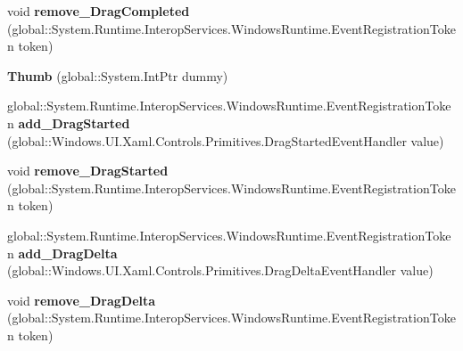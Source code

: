 \begin{DoxyCompactItemize}
\item 
\mbox{\label{class_windows_1_1_u_i_1_1_xaml_1_1_controls_1_1_primitives_1_1_thumb_a097aeafd8ad0e07599e35793e0ef16ca}} 
void {\bfseries remove\+\_\+\+Drag\+Completed} (global\+::\+System.\+Runtime.\+Interop\+Services.\+Windows\+Runtime.\+Event\+Registration\+Token token)
\item 
\mbox{\label{class_windows_1_1_u_i_1_1_xaml_1_1_controls_1_1_primitives_1_1_thumb_acd7bc9b9e039aaac5e1b684e7f15f078}} 
{\bfseries Thumb} (global\+::\+System.\+Int\+Ptr dummy)
\item 
\mbox{\label{class_windows_1_1_u_i_1_1_xaml_1_1_controls_1_1_primitives_1_1_thumb_ab1e477ea93baeef13137c92d8314a13a}} 
global\+::\+System.\+Runtime.\+Interop\+Services.\+Windows\+Runtime.\+Event\+Registration\+Token {\bfseries add\+\_\+\+Drag\+Started} (global\+::\+Windows.\+U\+I.\+Xaml.\+Controls.\+Primitives.\+Drag\+Started\+Event\+Handler value)
\item 
\mbox{\label{class_windows_1_1_u_i_1_1_xaml_1_1_controls_1_1_primitives_1_1_thumb_a44985b0beddf8dcf180137b37763091e}} 
void {\bfseries remove\+\_\+\+Drag\+Started} (global\+::\+System.\+Runtime.\+Interop\+Services.\+Windows\+Runtime.\+Event\+Registration\+Token token)
\item 
\mbox{\label{class_windows_1_1_u_i_1_1_xaml_1_1_controls_1_1_primitives_1_1_thumb_ab21b89a45b43ce6913868468c69ad277}} 
global\+::\+System.\+Runtime.\+Interop\+Services.\+Windows\+Runtime.\+Event\+Registration\+Token {\bfseries add\+\_\+\+Drag\+Delta} (global\+::\+Windows.\+U\+I.\+Xaml.\+Controls.\+Primitives.\+Drag\+Delta\+Event\+Handler value)
\item 
\mbox{\label{class_windows_1_1_u_i_1_1_xaml_1_1_controls_1_1_primitives_1_1_thumb_aafa7ff7377726fee9d57013616690ae3}} 
void {\bfseries remove\+\_\+\+Drag\+Delta} (global\+::\+System.\+Runtime.\+Interop\+Services.\+Windows\+Runtime.\+Event\+Registration\+Token token)

\end{DoxyCompactItemize}
